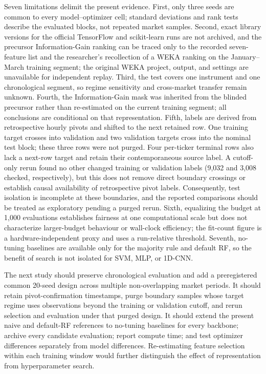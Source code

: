 Seven limitations delimit the present evidence. First, only three seeds are common to every model--optimizer cell; standard deviations and rank tests describe the evaluated blocks, not repeated market samples. Second, exact library versions for the official TensorFlow and scikit-learn runs are not archived, and the precursor Information-Gain ranking can be traced only to the recorded seven-feature list and the researcher's recollection of a WEKA ranking on the January--March training segment; the original WEKA project, output, and settings are unavailable for independent replay. Third, the test covers one instrument and one chronological segment, so regime sensitivity and cross-market transfer remain unknown. Fourth, the Information-Gain mask was inherited from the blinded precursor rather than re-estimated on the current training segment; all conclusions are conditional on that representation. Fifth, labels are derived from retrospective hourly pivots and shifted to the next retained row. One training target crosses into validation and two validation targets cross into the nominal test block; these three rows were not purged. Four per-ticker terminal rows also lack a next-row target and retain their contemporaneous source label. A cutoff-only rerun found no other changed training or validation labels (9,032 and 3,008 checked, respectively), but this does not remove direct boundary crossings or establish causal availability of retrospective pivot labels. Consequently, test isolation is incomplete at these boundaries, and the reported comparisons should be treated as exploratory pending a purged rerun. Sixth, equalizing the budget at 1,000 evaluations establishes fairness at one computational scale but does not characterize larger-budget behaviour or wall-clock efficiency; the fit-count figure is a hardware-independent proxy and uses a run-relative threshold. Seventh, no-tuning baselines are available only for the majority rule and default RF, so the benefit of search is not isolated for SVM, MLP, or 1D-CNN.

The next study should preserve chronological evaluation and add a preregistered common 20-seed design across multiple non-overlapping market periods. It should retain pivot-confirmation timestamps, purge boundary samples whose target regime uses observations beyond the training or validation cutoff, and rerun selection and evaluation under that purged design. It should extend the present naive and default-RF references to no-tuning baselines for every backbone; archive every candidate evaluation; report compute time; and test optimizer differences separately from model differences. Re-estimating feature selection within each training window would further distinguish the effect of representation from hyperparameter search.
